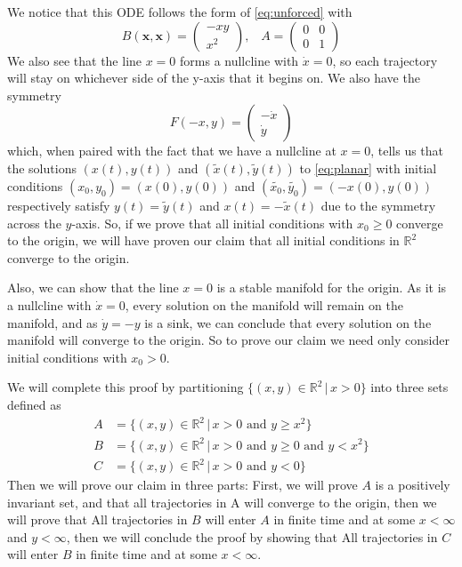 \documentclass[11pt]{article}
\newcommand{\R}{\mathbb{R}}
\begin{document}
We notice that this ODE follows the form of \eqref{eq:unforced} with $$B(\mathbf{x}, \mathbf{x}) = \begin{pmatrix}
    -xy\\
    x^2
\end{pmatrix}, \; \; \;  A = \begin{pmatrix}
    0 & 0 \\
    0 & 1
\end{pmatrix}$$
We also see that the line $x = 0$ forms a nullcline with $\dot{x} = 0$, so each trajectory will stay on whichever side of the y-axis that it begins on. We also have the symmetry $$F(-x, y) = \begin{pmatrix}
    -\dot{x}\\
    \dot{y}
\end{pmatrix}$$which, when paired with the fact that we have a nullcline at $x=0$, tells us that the solutions $(x(t), y(t))$ and $(\widetilde{x}(t), \widetilde{y}(t))$ to \eqref{eq:planar} with initial conditions $(x_0, y_0) = (x(0), y(0))$ and $(\widetilde{x_0}, \widetilde{y_0}) = (-x(0), y(0))$ respectively satisfy $y(t) = \widetilde{y}(t)$ and $x(t) = -\widetilde{x}(t)$ due to the symmetry across the $y$-axis. So, if we prove that all initial conditions with $x_0 \geq 0$ converge to the origin, we will have proven our claim that all initial conditions in $\R^2$ converge to the origin.

Also, we can show that the line $x = 0$ is a stable manifold for the origin. As it is a nullcline with $\dot{x} = 0$, every solution on the manifold will remain on the manifold, and as $\dot{y} = -y$ is a sink, we can conclude that every solution on the manifold will converge to the origin. So to prove our claim we need only consider initial conditions with $x_0 > 0$.

We will complete this proof by partitioning $\{(x, y) \in \R^2 \, | \, x>0 \} $ into three sets defined as 
\begin{align*}
    A &= \{ (x, y) \in \R^2 \, | \, x>0 \text{ and } y \geq x^2\}\\
    B &= \{ (x, y) \in \R^2 \, | \, x>0 \text{ and } y \geq 0 \text{ and } y < x^2\}\\
    C &= \{ (x, y) \in \R^2 \, | \, x>0 \text{ and } y < 0\}
\end{align*}
Then we will prove our claim in three parts: First, we will prove $A$ is a positively invariant set, and that all trajectories in A will converge to the origin, then we will prove that All trajectories in $B$ will enter $A$ in finite time and at some $x < \infty$ and $y < \infty$, then we will conclude the proof by showing that All trajectories in $C$ will enter $B$ in finite time and at some $x < \infty$.\\
\end{document}
